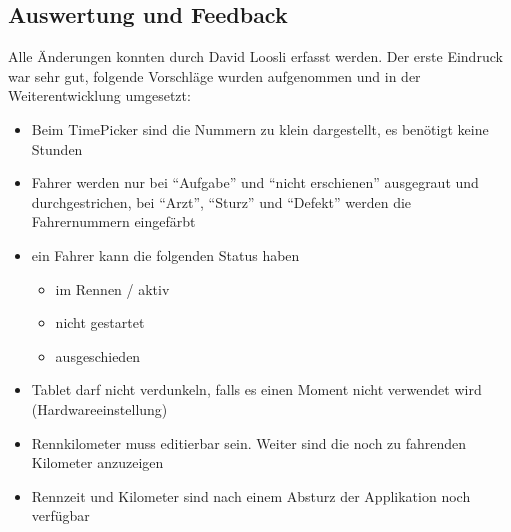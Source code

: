 \subsection{Auswertung und Feedback}
Alle Änderungen konnten durch David Loosli erfasst werden. Der erste Eindruck war sehr gut, folgende Vorschläge wurden aufgenommen und in der Weiterentwicklung umgesetzt:
\begin{itemize}
\item Beim TimePicker sind die Nummern zu klein dargestellt, es benötigt keine Stunden
\item Fahrer werden nur bei "`Aufgabe"'  und "`nicht erschienen"' ausgegraut und durchgestrichen, bei "`Arzt"', "`Sturz"' und "`Defekt"' werden die Fahrernummern eingefärbt
\item ein Fahrer kann die folgenden Status haben
\begin{itemize}
\item im Rennen / aktiv
\item nicht gestartet
\item ausgeschieden
\end{itemize}
\item Tablet darf nicht verdunkeln, falls es einen Moment nicht verwendet wird (Hardwareeinstellung)
\item Rennkilometer muss editierbar sein. Weiter sind die noch zu fahrenden Kilometer anzuzeigen
\item Rennzeit und Kilometer sind nach einem Absturz der Applikation noch verfügbar
\end{itemize}
